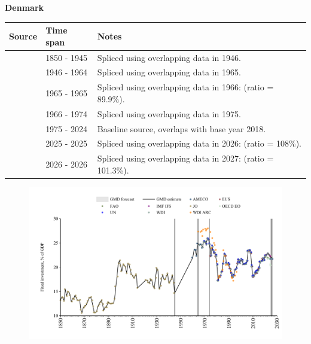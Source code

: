 \documentclass[12pt,a4paper,landscape]{article}
\begin{document}
\begin{adjustbox}{max totalsize={\paperwidth}{\paperheight},center}
\begin{minipage}[t][\textheight][t]{\textwidth}
\vspace*{0.5cm}
{}
\begin{center}
{\Large\bfseries Denmark}
\end{center}
\vspace{0.5cm}
\begin{table}[H]
\centering
\small
\begin{tabular}{|l|l|l|}
\hline
\textbf{Source} & \textbf{Time span} & \textbf{Notes} \\
\hline
\rowcolor{white}\cite{JO}& 1850 - 1945 &Spliced using overlapping data in 1946.\\
\rowcolor{lightgray}\cite{AMECO}& 1946 - 1964 &Spliced using overlapping data in 1965.\\
\rowcolor{white}\cite{WDI_ARC}& 1965 - 1965 &Spliced using overlapping data in 1966: (ratio = 89.9\%).\\
\rowcolor{lightgray}\cite{WDI}& 1966 - 1974 &Spliced using overlapping data in 1975.\\
\rowcolor{white}\cite{EUS}& 1975 - 2024 &Baseline source, overlaps with base year 2018.\\
\rowcolor{lightgray}\cite{OECD_EO}& 2025 - 2025 &Spliced using overlapping data in 2026: (ratio = 108\%).\\
\rowcolor{white}\cite{AMECO}& 2026 - 2026 &Spliced using overlapping data in 2027: (ratio = 101.3\%).\\
\hline
\end{tabular}
\end{table}
\begin{figure}[H]
\centering
\includegraphics[width=\textwidth,height=0.6\textheight,keepaspectratio]{graphs/DNK_finv_GDP.pdf}
\end{figure}
\end{minipage}
\end{adjustbox}
\end{document}
